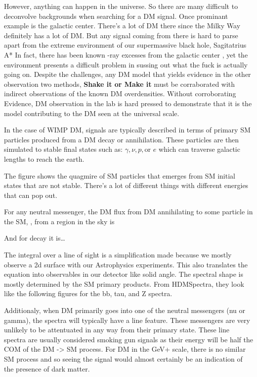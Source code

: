 However, anything can happen in the universe.
So there are many difficult to deconvolve backgrounds when searching for a DM signal.
Once prominant example is the galactic center.
There's a lot of DM there since the Milky Way definitely has a lot of DM.
But any signal coming from there is hard to parse apart from the extreme environment of our supermassive black hole, Sagitatrius A*
In fact, there has been known \textgamma -ray excesses from the galactic center \ns, yet the environment presents a difficult problem in sussing out what the fuck is actually going on.
Despite the challenges, any DM model that yields evidence in the other observation two methods, \textbf{Shake it or Make it} must be corraborated with indirect observations of the known DM overdensities.
Without corroborating Evidence, DM observation in the lab is hard pressed to demonstrate that it is the model contributing to the DM seen at the universal scale.

In the case of WIMP DM, signals are typically described in terms of primary SM particles produced from a DM decay or annihilation.
These particles are then simulated to stable final states such as: $\gamma, \nu, p, \text{or } e$ which can traverse galactic lengths to reach the earth.


The figure shows the quagmire of SM particles that emerges from SM initial states that are not stable.
There's a lot of different things with different energies that can pop out.

For any neutral messenger, the DM flux from DM annihilating to some particle in the SM, \textphi, from a region in the sky is


And for decay it is\dots



The integral over a line of sight is a simplification made because we mostly observe a 2d surface with our Astrophysics experiments.
This also translates the equation into observables in our detector like solid angle.
The spectral shape is mostly determined by the SM primary products.
From HDMSpectra, they look like the following figures for the bb, tau, and Z spectra.


Additionaly, when DM primarily goes into one of the neutral messengers (nu or gamma), the spectra will typically have a line feature.
These messengers are very unlikely to be attentuated in any way from their primary state.
These line spectra are usually considered smoking gun signals as their energy will be half the COM of the DM -> SM process.
For DM in the GeV+ scale, there is no similar SM process and so seeing the signal would almost certainly be an indication of the presence of dark matter.

